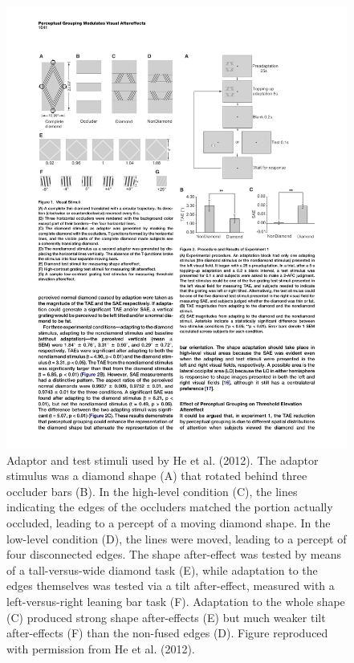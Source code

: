 \begin{figure}[!ht]
  \centering
  \includegraphics[]{he-et-al-2012-fig1.pdf}  
  \caption{Adaptor and test stimuli used by He et al. (2012).  The adaptor stimulus was a diamond shape (A) that rotated behind three occluder bars (B).  In the high-level condition (C), the lines indicating the edges of the occluders matched the portion actually occluded, leading to a percept of a moving diamond shape.  In the low-level condition (D), the lines were moved, leading to a percept of four disconnected edges.  The shape after-effect was tested by means of a tall-versus-wide diamond task (E), while adaptation to the edges themselves was tested via a tilt after-effect, measured with a left-versus-right leaning bar task (F).  Adaptation to the whole shape (C) produced strong shape after-effects (E) but much weaker tilt after-effects (F) than the non-fused edges (D).  Figure reproduced with permission from He et al. (2012).}
  \label{fig:he-et-al-2012-stims}
\end{figure}

